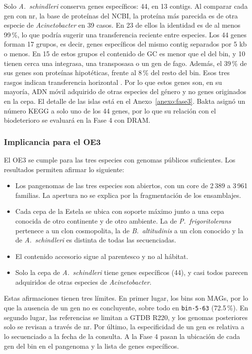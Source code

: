 Solo \textit{A.~schindleri} conserva genes específicos: 44, en 13 contigs. Al comparar cada gen 
con nr, la base de proteínas del NCBI, la proteína más
parecida es de otra especie de \textit{Acinetobacter} en 39 casos. En 23 de
ellos la identidad es de al menos 99\,\%, lo que podría sugerir una transferencia
reciente entre especies. Los 44 genes forman 17 grupos, es decir, genes específicos del mismo contig
separados por 5 kb o menos. En 15 de estos grupos el contenido de GC es menor
que el del bin, y 10 tienen cerca una integrasa, una transposasa o un gen de
fago. Además, el 39\,\% de sus genes son proteínas hipotéticas, frente al
8\,\% del resto del bin. Esos tres rasgos indican transferencia
horizontal \cite{ravenhall2015}. Por lo que estos genes son, en su mayoría, ADN
móvil adquirido de otras especies del género y no genes originados en la cepa.
El detalle de las islas está en el Anexo~\ref{anexo:fase3}. Bakta asignó un
número KEGG a solo uno de los 44 genes, por lo que su relación con el
biodeterioro se evaluará en la Fase 4 con DRAM.

\subsubsection{Implicancia para el OE3}
\label{subsubsec:implicancia_oe3}

El OE3 se cumple para las tres especies con genomas públicos suficientes. Los
resultados permiten afirmar lo siguiente:

\begin{itemize}
    \item Los pangenomas de las tres especies son abiertos, con un core de
    2\,389 a 3\,961 familias. La apertura no se explica por la fragmentación de
    los ensamblajes.
    \item Cada cepa de la Estela se ubica con soporte máximo junto a una cepa
    conocida de otro continente y de otro ambiente. La de
    \textit{P.~frigoritolerans} pertenece a un clon cosmopolita, la de
    \textit{B.~altitudinis} a un clon conocido y la de \textit{A.~schindleri} es
    distinta de todas las secuenciadas.
    \item El contenido accesorio sigue al parentesco y no al hábitat.
    \item Solo la cepa de \textit{A.~schindleri} tiene genes específicos (44), y
    casi todos parecen adquiridos de otras especies de \textit{Acinetobacter}.
\end{itemize}

Estas afirmaciones tienen tres límites. En primer lugar, los bins son MAGs, por
lo que la ausencia de un gen no es concluyente, sobre todo en
\texttt{bin-5-63} (72.5\,\%). En segundo lugar, las referencias se limitan a
GTDB R220, y los genomas posteriores solo se revisan a través de nr. Por
último, la especificidad de un gen es relativa a lo secuenciado a la fecha de
la consulta. A la Fase 4 pasan la ubicación de cada gen del bin en el pangenoma
y la lista de genes específicos.


